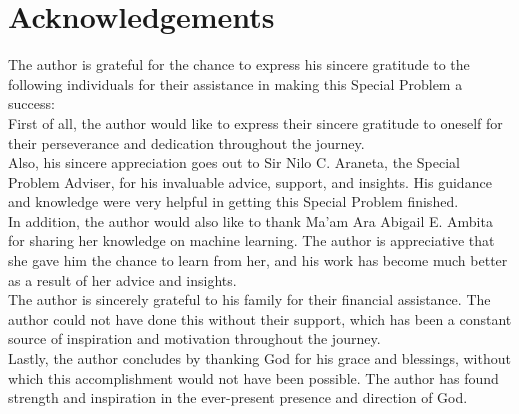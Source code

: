 \chapter{Acknowledgements}
\label{sec:appendix_e}
The author is grateful for the chance to express his sincere gratitude to the following 
individuals for their assistance in making this Special Problem a success:
\\

First of all, the author would like to express their sincere gratitude to oneself 
for their perseverance and dedication throughout the journey.
\\

Also, his sincere appreciation goes out to Sir Nilo C. Araneta, 
the Special Problem Adviser, for his invaluable advice, support, and insights. 
His guidance and knowledge were very helpful in getting this Special Problem finished.
\\

In addition, the author would also like to thank Ma'am Ara Abigail E. Ambita for 
sharing her knowledge on machine learning. The author is appreciative that she gave 
him the chance to learn from her, and his work has become much better as a result of her 
advice and insights.
\\

The author is sincerely grateful to his family for their financial assistance. 
The author could not have done this without their support, which has been a constant 
source of inspiration and motivation throughout the journey.
\\

Lastly, the author concludes by thanking God for his grace and blessings, without which this 
accomplishment would not have been possible. The author has found strength and inspiration 
in the ever-present presence and direction of God.
\\